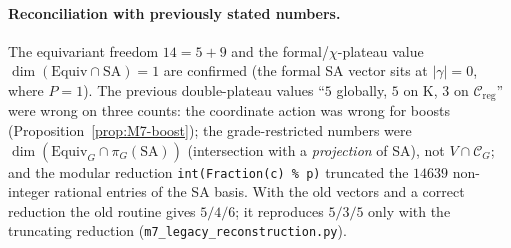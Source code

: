 \documentclass{article}
\theoremstyle{remark}
\newcommand{\Creg}{\mathcal C_{\mathrm{reg}}}
\begin{document}
\paragraph{Reconciliation with previously stated numbers.}
The equivariant freedom $14=5+9$ and the formal/$\chi$-plateau value $\dim(\mathrm{Equiv}\cap\mathrm{SA})=1$ are confirmed (the formal SA vector sits at $|\gamma|=0$, where $P=1$).
The previous double-plateau values ``$5$ globally, $5$ on K, $3$ on $\Creg$'' were wrong on three counts: the coordinate action was wrong for boosts (Proposition~\ref{prop:M7-boost}); the grade-restricted numbers were $\dim(\mathrm{Equiv}_G\cap\pi_G(\mathrm{SA}))$ (intersection with a \emph{projection} of SA), not $V\cap\mathcal C_G$; and the modular reduction \texttt{int(Fraction(c) \% p)} truncated the $14639$ non-integer rational entries of the SA basis.
With the old vectors and a correct reduction the old routine gives $5/4/6$; it reproduces $5/3/5$ only with the truncating reduction (\texttt{m7\_legacy\_reconstruction.py}).
\end{document}
